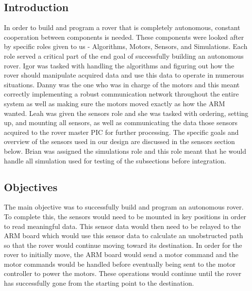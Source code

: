 





\usepackage[compact]{titlesec}





\subsection{Introduction}
In order to build and program a rover that is completely autonomous, constant cooperation between components is needed. These components were looked after by specific roles given to us - Algorithms, Motors, Sensors, and Simulations. Each role served a critical part of the end goal of successfully building an autonomous rover. Igor was tasked with handling the algorithms and figuring out how the rover should manipulate acquired data and use this data to operate in numerous situations. Danny was the one who was in charge of the motors and this meant correctly implementing a robust communication network throughout the entire system as well as making sure the motors moved exactly as how the ARM wanted. Leah was given the sensors role and she was tasked with ordering, setting up, and mounting all sensors, as well as communicating the data those sensors acquired to the rover master PIC for further processing. The specific goals and overview of the sensors used in our design are discussed in the sensors section below. Brian was assigned the simulations role and this role meant that he would handle all simulation used for testing of the subsections before integration.

\subsection{Objectives}
The main objective was to successfully build and program an autonomous rover. To complete this, the sensors would need to be mounted in key positions in order to read meaningful data. This sensor data would then need to be relayed to the ARM board which would use this sensor data to calculate an unobstructed path so that the rover would continue moving toward its destination. In order for the rover to initially move, the ARM board would send a motor command and the motor commands would be handled before eventually being sent to the motor controller to power the motors. These operations would continue until the rover has successfully gone from the starting point to the destination.

